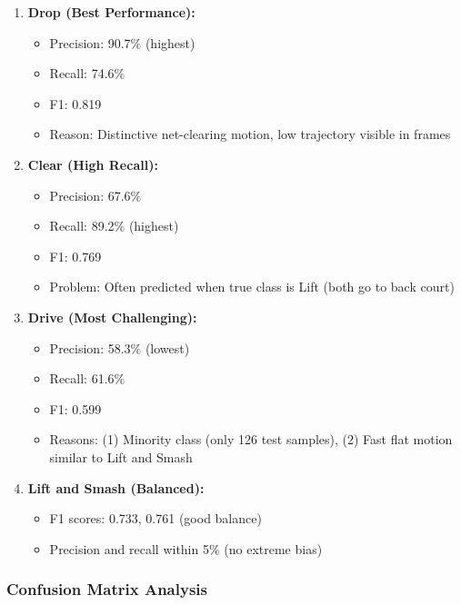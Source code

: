 \documentclass[11pt,a4paper]{article}
\begin{document}
\begin{enumerate}
\item \textbf{Drop (Best Performance):}
   \begin{itemize}
   \item Precision: 90.7\% (highest)
   \item Recall: 74.6\%
   \item F1: 0.819
   \item Reason: Distinctive net-clearing motion, low trajectory visible in frames
   \end{itemize}

\item \textbf{Clear (High Recall):}
   \begin{itemize}
   \item Precision: 67.6\%
   \item Recall: 89.2\% (highest)
   \item F1: 0.769
   \item Problem: Often predicted when true class is Lift (both go to back court)
   \end{itemize}

\item \textbf{Drive (Most Challenging):}
   \begin{itemize}
   \item Precision: 58.3\% (lowest)
   \item Recall: 61.6\%
   \item F1: 0.599
   \item Reasons: (1) Minority class (only 126 test samples), (2) Fast flat motion similar to Lift and Smash
   \end{itemize}

\item \textbf{Lift and Smash (Balanced):}
   \begin{itemize}
   \item F1 scores: 0.733, 0.761 (good balance)
   \item Precision and recall within 5\% (no extreme bias)
   \end{itemize}
\end{enumerate}

\subsubsection{Confusion Matrix Analysis}
\end{document}
